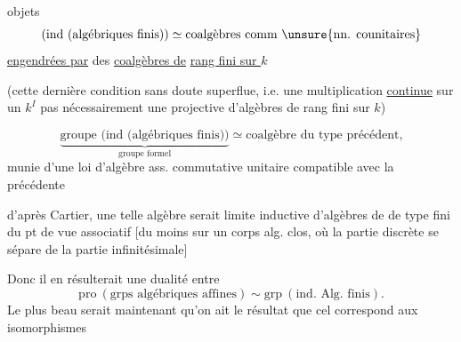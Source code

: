 
  objets
\[
\text{(ind (algébriques finis))}\simeq\text{coalgèbres comm \unsure{nn. counitaires}}
\]
 \uline{engendrées par} des \uline{coalgèbres de} \uline{rang fini sur $k$}

\deleted{[une telle coalgèbre est en effet engendrée par des coalgèbres}
(cette dernière condition sans doute superflue, i.e. une multiplication  \uline{continue} sur un $k^I$   pas nécessairement une   projective d'algèbres de rang fini sur $k$)


\[
\underbrace{\text{groupe (ind (algébriques finis))}}_{\text{groupe formel}}
\simeq\text{coalgèbre du type précédent,}
\]
munie d'une loi d'algèbre ass. commutative unitaire compatible avec la précédente


d'après Cartier,  une telle algèbre serait limite inductive d'algèbres de  de type fini du pt de vue associatif [du moins sur un corps alg. clos, où la partie discrète se sépare de la partie infinitésimale]

Donc il en résulterait une dualité entre
\[
\mathrm{pro}\ (\text{grps algébriques affines})\sim\mathrm{grp}\ (\text{ind. Alg. finis}).
\]
Le plus beau serait maintenant qu'on ait le résultat que cel correspond aux isomorphismes \uline{}
